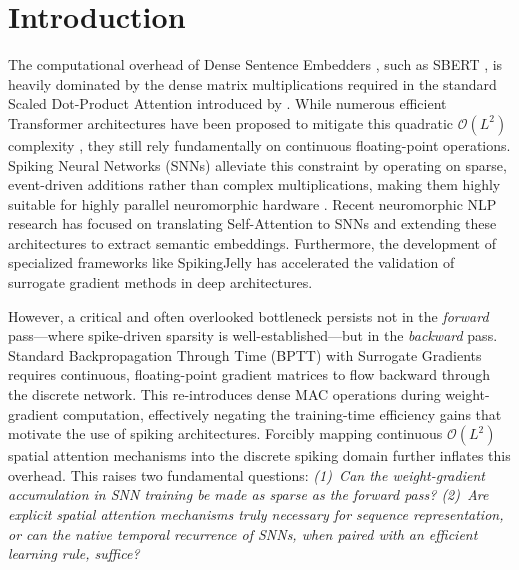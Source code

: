 \documentclass[10pt,a4paper,twoside]{article}
\begin{document}

\section{Introduction}

The computational overhead of Dense Sentence Embedders \cite{devlin2018bert}, such as SBERT \cite{reimers2019sentence}, is heavily dominated by the dense matrix multiplications required in the standard Scaled Dot-Product Attention introduced by \cite{vaswani2017attention}. While numerous efficient Transformer architectures have been proposed to mitigate this quadratic $\mathcal{O}(L^2)$ complexity \cite{tay2022efficient}, they still rely fundamentally on continuous floating-point operations. Spiking Neural Networks (SNNs) alleviate this constraint by operating on sparse, event-driven additions rather than complex multiplications, making them highly suitable for highly parallel neuromorphic hardware \cite{roy2019towards}. Recent neuromorphic NLP research has focused on translating Self-Attention to SNNs \cite{li2022spikeformer, zhu2023spikegpt} and extending these architectures to extract semantic embeddings. Furthermore, the development of specialized frameworks like SpikingJelly \cite{fang2023spikingjelly} has accelerated the validation of surrogate gradient methods in deep architectures.

However, a critical and often overlooked bottleneck persists not in the \textit{forward} pass---where spike-driven sparsity is well-established---but in the \textit{backward} pass. Standard Backpropagation Through Time (BPTT) with Surrogate Gradients \cite{neftci2019surrogate} requires continuous, floating-point gradient matrices to flow backward through the discrete network. This re-introduces dense MAC operations during weight-gradient computation, effectively negating the training-time efficiency gains that motivate the use of spiking architectures. Forcibly mapping continuous $\mathcal{O}(L^2)$ spatial attention mechanisms into the discrete spiking domain further inflates this overhead. This raises two fundamental questions: \textit{(1)~Can the weight-gradient accumulation in SNN training be made as sparse as the forward pass? (2)~Are explicit spatial attention mechanisms truly necessary for sequence representation, or can the native temporal recurrence of SNNs, when paired with an efficient learning rule, suffice?}
\end{document}
